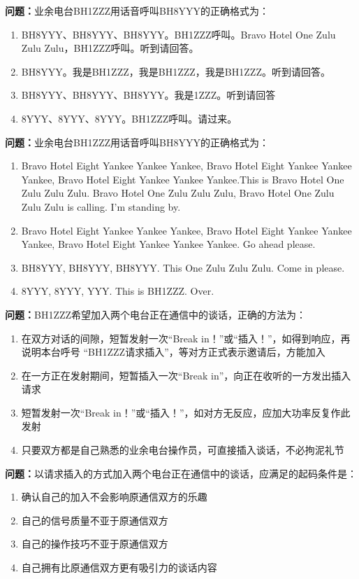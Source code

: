 \documentclass{ctexbook}%
\begin{document}
\textbf{问题：}业余电台BH1ZZZ用话音呼叫BH8YYY的正确格式为：
\begin{enumerate}[label=\Alph*), leftmargin=3em]
\item BH8YYY、BH8YYY、BH8YYY。BH1ZZZ呼叫。Bravo Hotel One Zulu Zulu Zulu，BH1ZZZ呼叫。听到请回答。
\item BH8YYY。我是BH1ZZZ，我是BH1ZZZ，我是BH1ZZZ。听到请回答。
\item BH8YYY、BH8YYY、BH8YYY。我是1ZZZ。听到请回答
\item 8YYY、8YYY、8YYY。BH1ZZZ呼叫。请过来。
\end{enumerate}

\textbf{问题：}业余电台BH1ZZZ用话音呼叫BH8YYY的正确格式为：
\begin{enumerate}[label=\Alph*), leftmargin=3em]
\item Bravo Hotel Eight Yankee Yankee Yankee, Bravo Hotel Eight Yankee Yankee Yankee, Bravo Hotel Eight Yankee Yankee Yankee.This is Bravo Hotel One Zulu Zulu Zulu. Bravo Hotel One Zulu Zulu Zulu, Bravo Hotel One Zulu Zulu Zulu is calling. I’m standing by.
\item Bravo Hotel Eight Yankee Yankee Yankee, Bravo Hotel Eight Yankee Yankee Yankee, Bravo Hotel Eight Yankee Yankee Yankee. Go ahead please.
\item BH8YYY, BH8YYY, BH8YYY. This One Zulu Zulu Zulu. Come in please.
\item 8YYY, 8YYY, YYY. This is BH1ZZZ. Over.
\end{enumerate}

\textbf{问题：}BH1ZZZ希望加入两个电台正在通信中的谈话，正确的方法为：
\begin{enumerate}[label=\Alph*), leftmargin=3em]
\item 在双方对话的间隙，短暂发射一次“Break in！”或“插入！”，如得到响应，再说明本台呼号 “BH1ZZZ请求插入”，等对方正式表示邀请后，方能加入
\item 在一方正在发射期间，短暂插入一次“Break in”，向正在收听的一方发出插入请求
\item 短暂发射一次“Break in！”或“插入！”，如对方无反应，应加大功率反复作此发射
\item 只要双方都是自己熟悉的业余电台操作员，可直接插入谈话，不必拘泥礼节
\end{enumerate}

\textbf{问题：}以请求插入的方式加入两个电台正在通信中的谈话，应满足的起码条件是：
\begin{enumerate}[label=\Alph*), leftmargin=3em]
\item 确认自己的加入不会影响原通信双方的乐趣
\item 自己的信号质量不亚于原通信双方
\item 自己的操作技巧不亚于原通信双方
\item 自己拥有比原通信双方更有吸引力的谈话内容
\end{enumerate}
\end{document}
